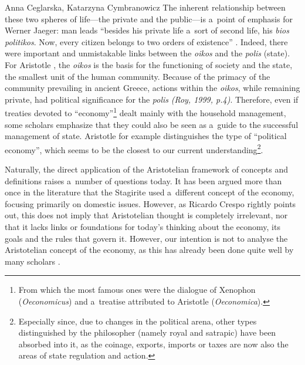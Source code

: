 \begin{artengenv2auth}{Anna Ceglarska, Katarzyna Cymbranowicz}
The inherent relationship between these two spheres of life---the private and the public---is a~point of emphasis for Werner Jaeger: man leads ``besides his private life a~sort of second life, his \textit{bios politikos}. Now, every citizen belongs to two orders of existence'' 
\parencite[][p.111]{jaeger_paideia_1946}. %
 Indeed, there were important and unmistakable links between the \textit{oikos} and the \textit{polis} (state). For Aristotle 
\parencite[][1253b.1]{rackham_nicomachean_1934}, %
 the \textit{oikos} is the basis for the functioning of society and the state, the smallest unit of the human community. Because of the primacy of the community prevailing in ancient Greece, actions within the \textit{oikos}, while remaining private, had political significance for the \textit{polis} \label{ref:RNDgDEuVBJb3a}\textit{(Roy, 1999, p.4)}. Therefore, even if treaties devoted to ``economy''\footnote{From which the most famous ones were the dialogue of Xenophon (\textit{Oeconomicus}) and a~treatise attributed to Aristotle (\textit{Oeconomica}).} dealt mainly with the household management, some scholars emphasize that they could also be seen as a~guide to the successful management of state. Aristotle 
\parencite*[][p.1345b]{aristotle_oeconomica_1920} %
 for example distinguishes the type of ``political economy'', which seems to be the closest to our current understanding\footnote{Especially since, due to changes in the political arena, other types distinguished by the philosopher (namely royal and satrapic) have been absorbed into it, as the coinage, exports, imports or taxes are now also the areas of state regulation and action.}.



Naturally, the direct application of the Aristotelian framework of concepts and definitions raises a~number of questions today. It has been argued more than once in the literature that the Stagirite used a~different concept of the economy, focusing primarily on domestic issues. However, as Ricardo Crespo 
\parencite*[][]{crespo_aristotle_2010} %
 rightly points out, this does not imply that Aristotelian thought is completely irrelevant, nor that it lacks links or foundations for today's thinking about the economy, its goals and the rules that govern it. However, our intention is not to analyse the Aristotelian concept of the economy, as this has already been done quite well by many scholars 
\parencites[e.g.,][]{crespo_ontology_2006}[][]{crespo_aristotle_2010}[][]{meikle_aristotles_1995}[][]{soudek_aristotles_1952}[][]{pack_aristotles_2008}[][]{finley_aristotle_1970}.%





\end{artengenv2auth}

